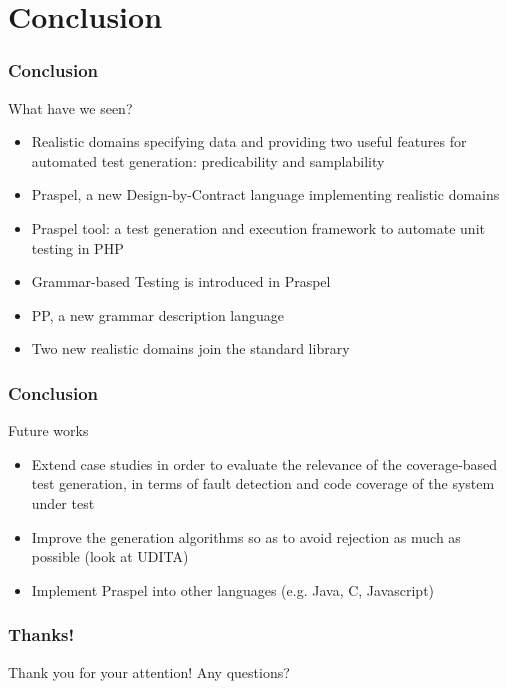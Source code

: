 \documentclass[9pt]{beamer}
\newcommand{\outlinereminder}[0]{
  \frame{\frametitle{Outline}
  \tableofcontents[currentsection,subsectionstyle=show/show/hide]}
}
\begin{document}
\section{Conclusion}

\outlinereminder

\begin{frame}
\frametitle{Conclusion}

\begin{block}{What have we seen?}
\begin{itemize}
\item Realistic domains specifying data and providing two useful features for
automated test generation: predicability and samplability
\item Praspel, a new Design-by-Contract language implementing realistic domains
\item Praspel tool: a test generation and execution framework to automate unit
testing in PHP
\item Grammar-based Testing is introduced in Praspel
\item PP, a new grammar description language
\item Two new realistic domains join the standard library
\end{itemize}
\end{block}

\end{frame}

\begin{frame}
\frametitle{Conclusion}

\begin{block}{Future works}
\begin{itemize}
\item Extend case studies in order to evaluate the relevance of the
coverage-based test generation, in terms of fault detection and code coverage of
the system under test
\item Improve the generation algorithms so as to avoid rejection as much as
possible (look at UDITA)
\item Implement Praspel into other languages (e.g. Java, C, Javascript)
\end{itemize}
\end{block}

\end{frame}

\begin{frame}
\frametitle{Thanks!}

\begin{center}
Thank you for your attention! Any questions?
\end{center}

\end{frame}
\end{document}
